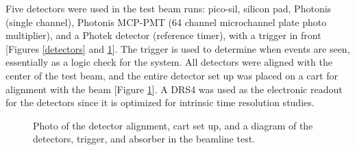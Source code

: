 \documentclass[twocolumn,aps,prd,reprint]{revtex4-1}
\begin{document}
Five detectors were used in the test beam runs: pico-sil, silicon pad, Photonis (single channel), Photonis MCP-PMT (64 channel microchannel plate photo multiplier), and a Photek detector (reference timer), with a trigger in front [Figures \ref{detectors} and \ref{beam line}]. The trigger is used to determine when events are seen, essentially as a logic check for the system. All detectors were aligned with the center of the test beam, and the entire detector set up was placed on a cart for alignment with the beam [Figure \ref{beam line}]. A DRS4 was used as the electronic readout for the detectors since it is optimized for intrinsic time resolution studies.

\begin{figure}[!htbp]
\centering
{} 
\hspace{8mm}
\caption{Photo of the detector alignment, cart set up, and a diagram of the detectors, trigger, and absorber in the beamline test.}
\label{beam line}
\end{figure}
\end{document}
